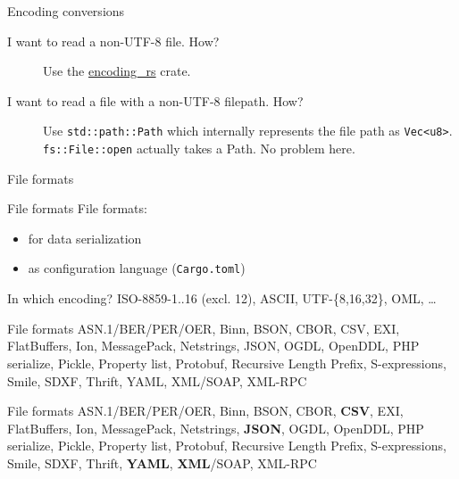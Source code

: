 \documentclass{beamer}
\begin{document}
\begin{frame}[fragile]{Encoding conversions}
  \begin{description}
    \item[I want to read a non-UTF-8 file. How?]
      Use the \href{https://docs.rs/encoding_rs/0.8.13/encoding_rs/}{encoding\_rs} crate.
    \item[I want to read a file with a non-UTF-8 filepath. How?]
      Use \texttt{std::path::Path} which internally represents the file path as \texttt{Vec<u8>}. \texttt{fs::File::open} actually takes a Path. No problem here.
  \end{description}
\end{frame}

\begin{frame}[standout]
  File formats
\end{frame}

\begin{frame}[fragile]{File formats}
  File formats:
  \begin{itemize}
    \item for data serialization
    \item as configuration language (\texttt{Cargo.toml})
  \end{itemize}
  In which encoding? ISO-8859-1..16 (excl. 12), ASCII, UTF-\{8,16,32\}, OML, \dots
\end{frame}

\begin{frame}[fragile]{File formats}
  ASN.1/BER/PER/OER, Binn, BSON, CBOR, CSV, EXI, FlatBuffers, Ion, MessagePack, Netstrings, JSON, OGDL, OpenDDL, PHP serialize, Pickle, Property list, Protobuf, Recursive Length Prefix, S-expressions, Smile, SDXF, Thrift, YAML, XML/SOAP, XML-RPC
\end{frame}

\begin{frame}[fragile]{File formats}
  ASN.1/BER/PER/OER, Binn, BSON, CBOR, \textbf{CSV}, EXI, FlatBuffers, Ion, MessagePack, Netstrings, \textbf{JSON}, OGDL, OpenDDL, PHP serialize, Pickle, Property list, Protobuf, Recursive Length Prefix, S-expressions, Smile, SDXF, Thrift, \textbf{YAML}, \textbf{XML}/SOAP, XML-RPC
\end{frame}
  
\end{document}
